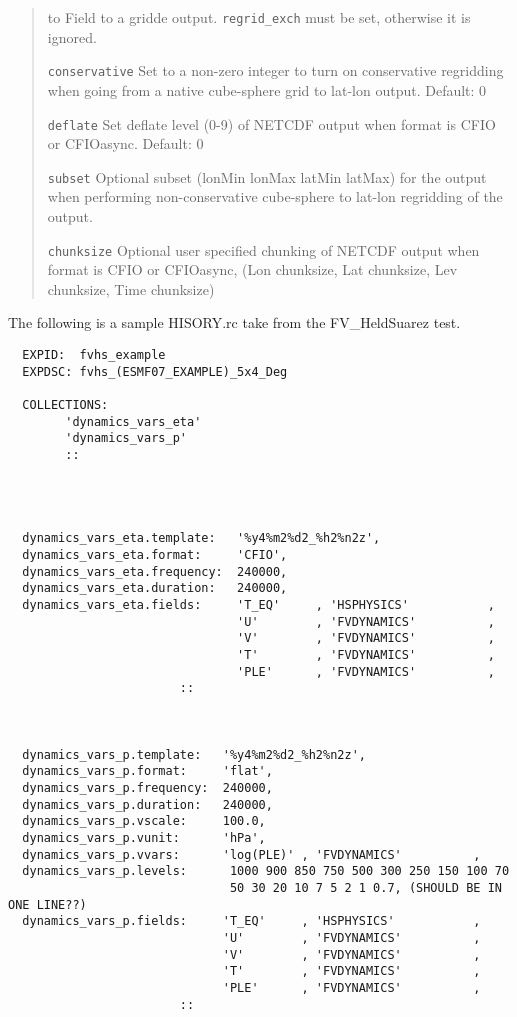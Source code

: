 \begin{quote}
\begin{trivlist}
                          to Field to a gridde output. {\tt regrid\_exch} must be set, otherwise
                          it is ignored.
 \item[\tt conservative]  Set to a non-zero integer to turn on conservative regridding when going
                          from a native cube-sphere grid to lat-lon output.
                          Default: 0
 \item[\tt deflate]       Set deflate level (0-9) of NETCDF output when format is CFIO or CFIOasync.
                          Default: 0
 \item[\tt subset]        Optional subset (lonMin lonMax latMin latMax) for the output when performing
                          non-conservative cube-sphere to lat-lon regridding of the output.
 \item[\tt chunksize]     Optional user specified chunking of NETCDF output when format is CFIO or CFIOasync,
                          (Lon chunksize, Lat chunksize, Lev chunksize, Time chunksize)
\end{trivlist}
\end{quote}

 The following is a sample HISORY.rc take from the FV\_HeldSuarez test.
 \begin{verbatim}
  EXPID:  fvhs_example
  EXPDSC: fvhs_(ESMF07_EXAMPLE)_5x4_Deg

  COLLECTIONS:
        'dynamics_vars_eta'
        'dynamics_vars_p'
        ::
 
 
 
 
  dynamics_vars_eta.template:   '%y4%m2%d2_%h2%n2z',
  dynamics_vars_eta.format:     'CFIO',
  dynamics_vars_eta.frequency:  240000,
  dynamics_vars_eta.duration:   240000,
  dynamics_vars_eta.fields:     'T_EQ'     , 'HSPHYSICS'           ,
                                'U'        , 'FVDYNAMICS'          ,
                                'V'        , 'FVDYNAMICS'          ,
                                'T'        , 'FVDYNAMICS'          ,
                                'PLE'      , 'FVDYNAMICS'          ,
                        ::
 
 
 
  dynamics_vars_p.template:   '%y4%m2%d2_%h2%n2z',
  dynamics_vars_p.format:     'flat',
  dynamics_vars_p.frequency:  240000,
  dynamics_vars_p.duration:   240000,
  dynamics_vars_p.vscale:     100.0,
  dynamics_vars_p.vunit:      'hPa',
  dynamics_vars_p.vvars:      'log(PLE)' , 'FVDYNAMICS'          ,   
  dynamics_vars_p.levels:      1000 900 850 750 500 300 250 150 100 70 
                               50 30 20 10 7 5 2 1 0.7, (SHOULD BE IN ONE LINE??)
  dynamics_vars_p.fields:     'T_EQ'     , 'HSPHYSICS'           ,
                              'U'        , 'FVDYNAMICS'          ,
                              'V'        , 'FVDYNAMICS'          ,
                              'T'        , 'FVDYNAMICS'          ,
                              'PLE'      , 'FVDYNAMICS'          ,
                        ::
 \end{verbatim}

